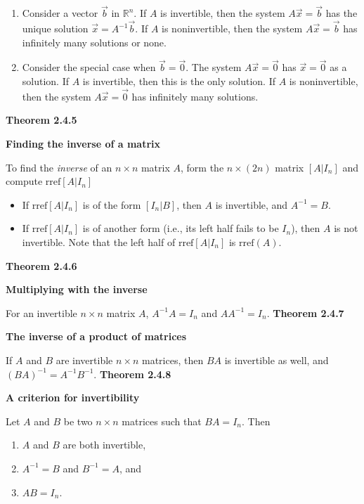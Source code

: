 \begin{enumerate}
\item Consider a vector $\vec{b}$ in $\mathbb{R}^{n}$. If $A$ is invertible, then the system $A\vec{x}=\vec{b}$ has the unique solution $\vec{x}=A^{-1}\vec{b}$. If $A$ is noninvertible, then the system $A\vec{x}=\vec{b}$ has infinitely many solutions or none.
\item Consider the special case when $\vec{b}=\vec{0}$. The system $A\vec{x}=\vec{0}$ has $\vec{x}=\vec{0}$ as a solution. If $A$ is invertible, then this is the only solution. If $A$ is noninvertible, then the system $A\vec{x}=\vec{0}$ has infinitely many solutions.
\end{enumerate}
\textbf{Theorem 2.4.5}\\
\par\noindent\textbf{Finding the inverse of a matrix}
\par\noindent To find the \textit{inverse} of an $n\times{}n$ matrix $A$, form the $n\times{}(2n)$ matrix $\left[A|I_{n}\right]$ and compute $\textrm{rref}\left[A|I_{n}\right]$
\begin{itemize}
\item If $\textrm{rref}\left[A|I_{n}\right]$ is of the form $\left[I_{n}|B\right]$, then $A$ is invertible, and $A^{-1}=B$.
\item If $\textrm{rref}\left[A|I_{n}\right]$ is of another form (i.e., its left half fails to be $I_{n}$), then $A$ is not invertible. Note that the left half of $\textrm{rref}\left[A|I_{n}\right]$ is $\textrm{rref}(A)$.
\end{itemize}
\textbf{Theorem 2.4.6}\\
\par\noindent\textbf{Multiplying with the inverse}
\par\noindent For an invertible $n\times{}n$ matrix $A$, $A^{-1}A=I_{n}$ and $AA^{-1}=I_{n}$.
\textbf{Theorem 2.4.7}\\
\par\noindent\textbf{The inverse of a product of matrices}
\par\noindent If $A$ and $B$ are invertible $n\times{}n$ matrices, then $BA$ is invertible as well, and $(BA)^{-1}=A^{-1}B^{-1}$.
\textbf{Theorem 2.4.8}\\
\par\noindent\textbf{A criterion for invertibility}
\par\noindent Let $A$ and $B$ be two $n\times{}n$ matrices such that $BA=I_{n}$. Then
\renewcommand{\labelenumi}{\textbf{\alph{enumi}.}}
\begin{enumerate}
\item $A$ and $B$ are both invertible,
\item $A^{-1}=B$ and $B^{-1}=A$, and
\item $AB=I_{n}$.
\end{enumerate}
